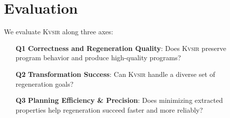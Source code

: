 \documentclass[sigplan]{acmart}
\newcommand{\sys}{{\scshape Kv{\textalpha}sir}\xspace}
\newcommand{\heading}[1]{\vspace{2pt}\noindent\textbf{\emph{#1}}:\enspace}
\begin{document}




\section{Evaluation}
\label{sec:evaluation}

We evaluate \sys along three axes:

\begin{itemize}
  \item[\textbf{Q1}] \textbf{Correctness and Regeneration Quality}: Does \sys preserve program behavior and produce high-quality programs?
  \item[\textbf{Q2}] \textbf{Transformation Success}: Can \sys handle a diverse set of regeneration goals?
  \item[\textbf{Q3}] \textbf{Planning Efficiency \& Precision}: Does minimizing extracted properties help regeneration succeed faster and more reliably?
\end{itemize}
\end{document}
